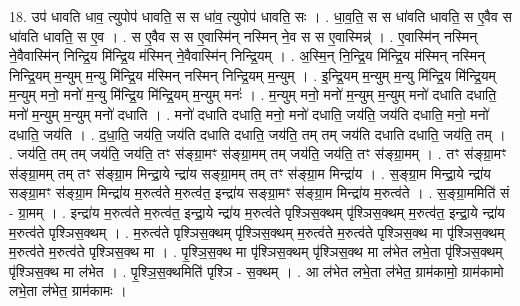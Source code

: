 \documentclass[17pt]{extarticle}
\begin{document}
18. उप॑ धावति धाव॒ त्युपोप॑ धावति॒ स स धा॑व॒ त्युपोप॑ धावति॒ सः । . धा॒व॒ति॒ स स धा॑वति धावति॒ स ए॒वैव स धा॑वति धावति॒ स ए॒व । . स ए॒वैव स स ए॒वास्मि॑न् नस्मिन् ने॒व स स ए॒वास्मिन्न्॑ । . ए॒वास्मि॑न् नस्मिन् ने॒वैवास्मि॑न् निन्द्रि॒य मि॑न्द्रि॒य म॑स्मिन् ने॒वैवास्मि॑न् निन्द्रि॒यम् । . अ॒स्मि॒न् नि॒न्द्रि॒य मि॑न्द्रि॒य म॑स्मिन् नस्मिन् निन्द्रि॒यम् म॒न्युम् म॒न्यु मि॑न्द्रि॒य म॑स्मिन् नस्मिन् निन्द्रि॒यम् म॒न्युम् । . इ॒न्द्रि॒यम् म॒न्युम् म॒न्यु मि॑न्द्रि॒य मि॑न्द्रि॒यम् म॒न्युम् मनो॒ मनो॑ म॒न्यु मि॑न्द्रि॒य मि॑न्द्रि॒यम् म॒न्युम् मनः॑ । . म॒न्युम् मनो॒ मनो॑ म॒न्युम् म॒न्युम् मनो॑ दधाति दधाति॒ मनो॑ म॒न्युम् म॒न्युम् मनो॑ दधाति । . मनो॑ दधाति दधाति॒ मनो॒ मनो॑ दधाति॒ जय॑ति॒ जय॑ति दधाति॒ मनो॒ मनो॑ दधाति॒ जय॑ति । . द॒धा॒ति॒ जय॑ति॒ जय॑ति दधाति दधाति॒ जय॑ति॒ तम् तम् जय॑ति दधाति दधाति॒ जय॑ति॒ तम् । . जय॑ति॒ तम् तम् जय॑ति॒ जय॑ति॒ तꣳ स॑ङ्ग्रा॒मꣳ स॑ङ्ग्रा॒मम् तम् जय॑ति॒ जय॑ति॒ तꣳ स॑ङ्ग्रा॒मम् । . तꣳ स॑ङ्ग्रा॒मꣳ स॑ङ्ग्रा॒मम् तम् तꣳ स॑ङ्ग्रा॒म मिन्द्रा॒ये न्द्रा॑य सङ्ग्रा॒मम् तम् तꣳ स॑ङ्ग्रा॒म मिन्द्रा॑य । . स॒ङ्ग्रा॒म मिन्द्रा॒ये न्द्रा॑य सङ्ग्रा॒मꣳ स॑ङ्ग्रा॒म मिन्द्रा॑य म॒रुत्व॑ते म॒रुत्व॑त॒ इन्द्रा॑य सङ्ग्रा॒मꣳ स॑ङ्ग्रा॒म मिन्द्रा॑य म॒रुत्व॑ते । . स॒ङ्ग्रा॒ममिति॑ सं - ग्रा॒मम् । . इन्द्रा॑य म॒रुत्व॑ते म॒रुत्व॑त॒ इन्द्रा॒ये न्द्रा॑य म॒रुत्व॑ते पृश्ञिस॒क्थम् पृ॑श्ञिस॒क्थम् म॒रुत्व॑त॒ इन्द्रा॒ये न्द्रा॑य म॒रुत्व॑ते पृश्ञिस॒क्थम् । . म॒रुत्व॑ते पृश्ञिस॒क्थम् पृ॑श्ञिस॒क्थम् म॒रुत्व॑ते म॒रुत्व॑ते पृश्ञिस॒क्थ मा पृ॑श्ञिस॒क्थम् म॒रुत्व॑ते म॒रुत्व॑ते पृश्ञिस॒क्थ मा । . पृ॒श्ञि॒स॒क्थ मा पृ॑श्ञिस॒क्थम् पृ॑श्ञिस॒क्थ मा ल॑भेत लभे॒ता पृ॑श्ञिस॒क्थम् पृ॑श्ञिस॒क्थ मा ल॑भेत । . पृ॒श्ञि॒स॒क्थमिति॑ पृश्ञि - स॒क्थम् । . आ ल॑भेत लभे॒ता ल॑भेत॒ ग्राम॑कामो॒ ग्राम॑कामो लभे॒ता ल॑भेत॒ ग्राम॑कामः । \newline
\end{document}
